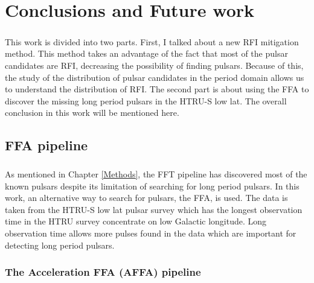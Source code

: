 \documentclass[../chapter1/thesis_msc.tex]{subfiles}
\begin{document}
\chapter{Conclusions and Future work} \label{Con}
\paragraph{} This work is divided into two parts. First, I talked about a new RFI mitigation method. This method takes an advantage of the fact that most of the pulsar candidates are RFI, decreasing the possibility of finding pulsars. Because of this, the study of the distribution of pulsar candidates in the period domain allows us to understand the distribution of RFI. The second part is about using the FFA to discover the missing long period pulsars in the HTRU-S low lat. The overall conclusion in this work will be mentioned here. 



\section{FFA pipeline}
\paragraph{} As mentioned in Chapter \ref{Methods}, the FFT pipeline has discovered most of the known pulsars despite its limitation of searching for long period pulsars. In this work, an alternative way to search for pulsars, the FFA, is used. The data is taken from the HTRU-S low lat pulsar survey which has the longest observation time in the HTRU survey concentrate on low Galactic longitude. Long observation time allows more pulses found in the data which are important for detecting long period pulsars.

\subsection{The Acceleration FFA (AFFA) pipeline}
\end{document}
